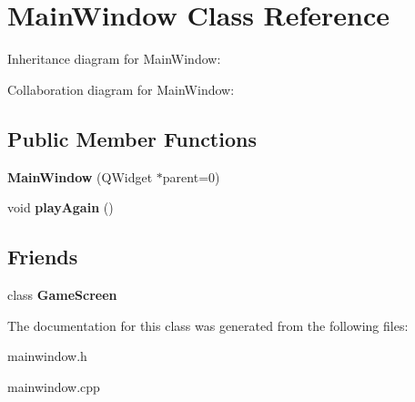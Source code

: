 \hypertarget{class_main_window}{\section{Main\-Window Class Reference}
\label{class_main_window}
}


Inheritance diagram for Main\-Window\-:


Collaboration diagram for Main\-Window\-:
\subsection*{Public Member Functions}
\begin{DoxyCompactItemize}
\item 
\hypertarget{class_main_window_a8b244be8b7b7db1b08de2a2acb9409db}{{\bfseries Main\-Window} (Q\-Widget $\ast$parent=0)}\label{class_main_window_a8b244be8b7b7db1b08de2a2acb9409db}

\item 
\hypertarget{class_main_window_ab622d7f3b4082b8221185e216991e602}{void {\bfseries play\-Again} ()}\label{class_main_window_ab622d7f3b4082b8221185e216991e602}

\end{DoxyCompactItemize}
\subsection*{Friends}
\begin{DoxyCompactItemize}
\item 
\hypertarget{class_main_window_a56592566d22f2b39f7d090a5001d3988}{class {\bfseries Game\-Screen}}\label{class_main_window_a56592566d22f2b39f7d090a5001d3988}

\end{DoxyCompactItemize}


The documentation for this class was generated from the following files\-:\begin{DoxyCompactItemize}
\item 
mainwindow.\-h\item 
mainwindow.\-cpp\end{DoxyCompactItemize}
